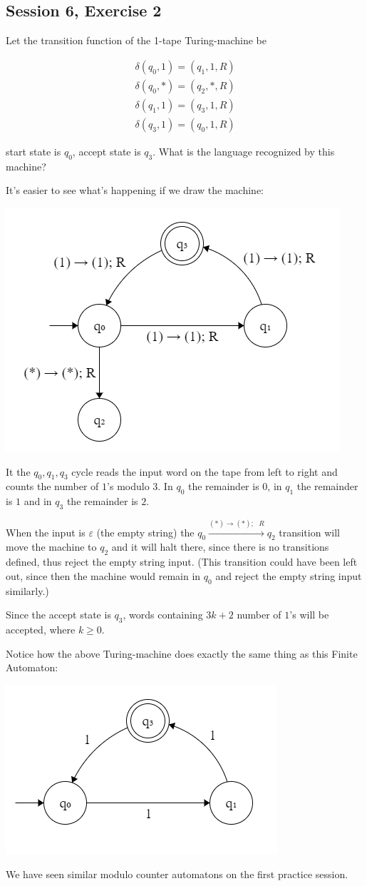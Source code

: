 \subsection {Session 6, Exercise 2}


Let the transition function of the 1-tape Turing-machine be

\begin{align*}
    \delta(q_0,1) = (q_1,1,R)\\
    \delta(q_0,*) = (q_2,*,R)\\
    \delta(q_1,1) = (q_3,1,R)\\
    \delta(q_3,1) = (q_0,1,R)
\end{align*}


start state is $q_0$, accept state is $q_3$. What is the language recognized by this machine?


It's easier to see what's happening if we draw the machine:

\includegraphics[width=0.5\linewidth]{06/6_2.png}

It the $q_0, q_1, q_3$ cycle reads the input word on the tape from left to right and counts the number of $1$'s modulo $3$. In $q_0$ the remainder is $0$, in $q_1$ the remainder is $1$ and in $q_3$ the remainder is $2$.

When the input is $\varepsilon$ (the empty string) the $q_0 \xrightarrow{(*) \rightarrow (*);\text{ }R} q_2$ transition will move the machine to $q_2$ and it will halt there, since there is no transitions defined, thus reject the empty string input. (This transition could have been left out, since then the machine would remain in $q_0$ and reject the empty string input similarly.)

Since the accept state is $q_3$, words containing $3k+2$ number of $1$'s will be accepted, where $k\geq{}0$.

Notice how the above Turing-machine does exactly the same thing as this Finite Automaton:

\includegraphics[width=0.6\linewidth]{06/6_2_b.png}

We have seen similar modulo counter automatons on the first practice session.
